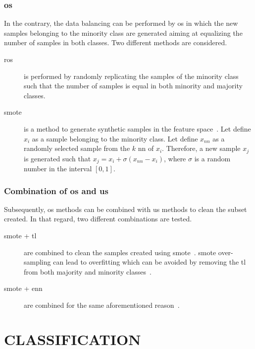 \subsubsection{\acl{os}}

\noindent In the contrary, the data balancing can be performed by \ac{os} in which the new samples belonging to the minority class are generated aiming at equalizing the number of samples in both classes.
Two different methods are considered.

\begin{description}
\item[\Ac{ros}] is performed by randomly replicating the samples of the minority class such that the number of samples is equal in both minority and majority classes.
\item[\Ac{smote}] is a method to generate synthetic samples in the feature space~\cite{chawla2002smote}.
Let define $x_i$ as a sample belonging to the minority class.
Let define $x_{nn}$ as a randomly selected sample from the $k$ \ac{nn} of $x_i$.
Therefore, a new sample $x_j$ is generated such that $x_j = x_i + \sigma \left( x_{nn} - x_i \right)$, where $\sigma$ is a random number in the interval $\left[0,1\right]$.
\end{description}

\subsubsection{Combination of \ac{os} and \ac{us}}

\noindent Subsequently, \ac{os} methods can be combined with \ac{us} methods to clean the subset created.
In that regard, two different combinations are tested.

\begin{description}
  \item[\ac{smote} + \ac{tl}] are combined to clean the samples created using \ac{smote}~\cite{batista2003balancing}.
\ac{smote} over-sampling can lead to overfitting which can be avoided by removing the \ac{tl} from both majority and minority classes~\cite{prati2009data}.
  \item[\ac{smote} + \ac{enn}] are combined for the same aforementioned reason~\cite{batista2004study}.
\end{description}

\section{\uppercase{Classification}}
\label{sec:clas-val}

